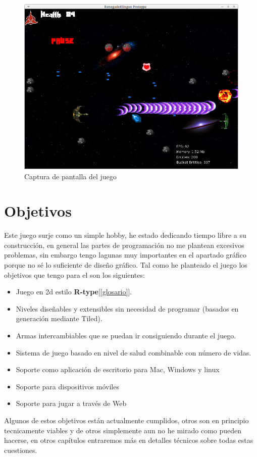 \begin{figure}[t]
\centering
\includegraphics[width=\linewidth]{includes/images/Screen_Shoot1.png}
\caption{Captura de pantalla del juego}
\label{fig:RenegadeKlingonScreenShoot}
\end{figure}


\section{Objetivos}

Este juego surje como un simple hobby, he estado dedicando tiempo libre a su construcción, en general las partes de programación no me plantean excesivos problemas, sin embargo tengo lagunas muy importantes en el apartado gráfico porque no sé lo suficiente de diseño gráfico.
Tal como he planteado el juego los objetivos que tengo para el son los siguientes:

\begin{itemize}
\item Juego en 2d estilo \textbf{R-type}[\ref{glosario}].
\item Niveles diseñables y extensibles sin necesidad de programar (basados en generación mediante Tiled).
\item Armas intercambiables que se puedan ir consiguiendo durante el juego.
\item Sistema de juego basado en nivel de salud combinable con número de vidas.
\item Soporte como aplicación de escritorio para Mac, Windows y linux
\item Soporte para dispositivos móviles
\item Soporte para jugar a través de Web
\end{itemize}

Algunos de estos objetivos están actualmente cumplidos, otros son en principio tecnicamente viables y de otros simplemente aun no he mirado como pueden hacerse, en otros capítulos entraremos más en detalles técnicos sobre todas estas cuestiones.

